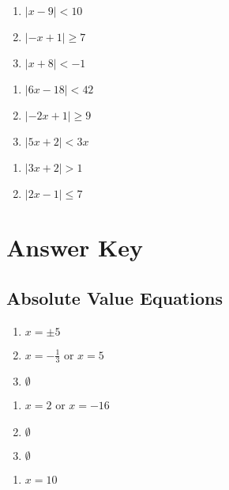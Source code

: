 \begin{multicols}{3}
\begin{enumerate}
	\item $|x-9| < 10$
	\item $|-x+1| \geq 7$
	\item $|x+8| < -1$
\end{enumerate}	\setcounter{Review}{\value{enumi}}
\end{multicols}
\begin{multicols}{3}
\begin{enumerate}	\setcounter{enumi}{\value{Review}}
	\item $|6x - 18| < 42$
	\item $|-2x+1| \geq 9$
	\item $|5x + 2| < 3x$
\end{enumerate}	\setcounter{Review}{\value{enumi}}
\end{multicols}
\begin{multicols}{3}
\begin{enumerate}	\setcounter{enumi}{\value{Review}}
	\item $|3x + 2| > 1$
    \item $|2x - 1| \leq 7$ 
\end{enumerate}	\setcounter{Review}{\value{enumi}}
\end{multicols}



\newpage

\section*{Answer Key}

\subsection*{Absolute Value Equations}

\begin{multicols}{3}
\begin{enumerate}
	\item $x = \pm 5$
	\item $x = -\frac{1}{3} \text{ or } x = 5$
	\item $\emptyset$
\end{enumerate}	\setcounter{Review}{\value{enumi}}
\end{multicols}
\begin{multicols}{3}
\begin{enumerate}	\setcounter{enumi}{\value{Review}}
	\item $x = 2$ or $x = -16$
	\item $\emptyset$
	\item $\emptyset$
\end{enumerate}	\setcounter{Review}{\value{enumi}}
\end{multicols}
\begin{multicols}{3}
\begin{enumerate}	\setcounter{enumi}{\value{Review}}
	\item $x = 10$
\end{enumerate}	\setcounter{Review}{\value{enumi}}
\end{multicols}



